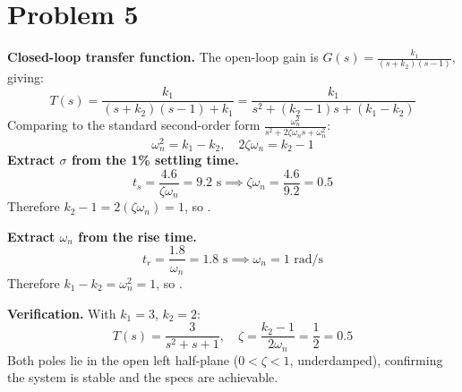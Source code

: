 \documentclass[12pt]{article}
\begin{document}
\section*{Problem 5}

\textbf{Closed-loop transfer function.} The open-loop gain is $G(s) = \frac{k_1}{(s + k_2)(s - 1)}$, giving:
\[
T(s) = \frac{k_1}{(s + k_2)(s - 1) + k_1} = \frac{k_1}{s^2 + (k_2 - 1)s + (k_1 - k_2)}
\]
Comparing to the standard second-order form $\frac{\omega_n^2}{s^2 + 2\zeta\omega_n s + \omega_n^2}$:
\[
\omega_n^2 = k_1 - k_2, \quad 2\zeta\omega_n = k_2 - 1
\]
\textbf{Extract $\sigma$ from the 1\% settling time.}
\[
t_s = \frac{4.6}{\zeta\omega_n} = 9.2 \text{ s} \implies \zeta\omega_n = \frac{4.6}{9.2} = 0.5
\]
Therefore $k_2 - 1 = 2(\zeta\omega_n) = 1$, so .

\vspace{0.5em}
\noindent \textbf{Extract $\omega_n$ from the rise time.}
\[
t_r = \frac{1.8}{\omega_n} = 1.8 \text{ s} \implies \omega_n = 1 \text{ rad/s}
\]
Therefore $k_1 - k_2 = \omega_n^2 = 1$, so .

\vspace{0.5em}
\noindent \textbf{Verification.} With $k_1 = 3$, $k_2 = 2$:
\[
T(s) = \frac{3}{s^2 + s + 1}, \quad \zeta = \frac{k_2 - 1}{2\omega_n} = \frac{1}{2} = 0.5
\]
Both poles lie in the open left half-plane ($0 < \zeta < 1$, underdamped), confirming the system is stable and the specs are achievable.
\end{document}
